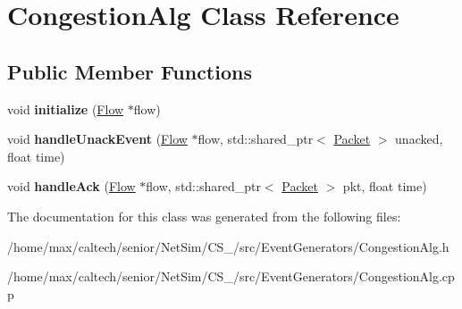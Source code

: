 \hypertarget{classCongestionAlg}{\section{\-Congestion\-Alg \-Class \-Reference}
\label{classCongestionAlg}
}
\subsection*{\-Public \-Member \-Functions}
\begin{DoxyCompactItemize}
\item 
\hypertarget{classCongestionAlg_a9f9c7b919053bc680f72f30afacba8c0}{void {\bfseries initialize} (\hyperlink{classFlow}{\-Flow} $\ast$flow)}\label{classCongestionAlg_a9f9c7b919053bc680f72f30afacba8c0}

\item 
\hypertarget{classCongestionAlg_af38f56763c73836b7a1528ceb85dbf7c}{void {\bfseries handle\-Unack\-Event} (\hyperlink{classFlow}{\-Flow} $\ast$flow, std\-::shared\-\_\-ptr$<$ \hyperlink{classPacket}{\-Packet} $>$ unacked, float time)}\label{classCongestionAlg_af38f56763c73836b7a1528ceb85dbf7c}

\item 
\hypertarget{classCongestionAlg_a6411b58a5608f9345e38bc35635e681b}{void {\bfseries handle\-Ack} (\hyperlink{classFlow}{\-Flow} $\ast$flow, std\-::shared\-\_\-ptr$<$ \hyperlink{classPacket}{\-Packet} $>$ pkt, float time)}\label{classCongestionAlg_a6411b58a5608f9345e38bc35635e681b}

\end{DoxyCompactItemize}


\-The documentation for this class was generated from the following files\-:\begin{DoxyCompactItemize}
\item 
/home/max/caltech/senior/\-Net\-Sim/\-C\-S\-\_/src/\-Event\-Generators/\-Congestion\-Alg.\-h\item 
/home/max/caltech/senior/\-Net\-Sim/\-C\-S\-\_/src/\-Event\-Generators/\-Congestion\-Alg.\-cpp\end{DoxyCompactItemize}
